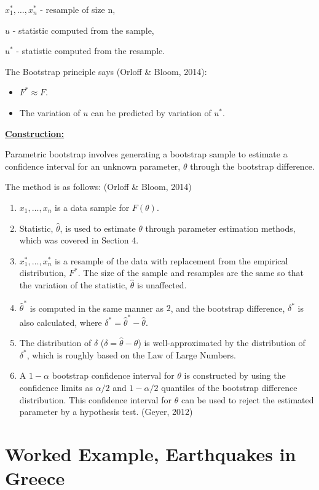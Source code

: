 \documentclass{article}
\begin{document}
$x^{*}_1,\ldots, x^{*}_n$ - resample of size n,

$u$ - statistic computed from the sample,

$u^{*}$ - statistic computed from the resample.

The Bootstrap principle says (Orloff \& Bloom, 2014):
\begin{itemize}
  \item $F^{*} \approx F$.
  \item The variation of $u$ can be predicted by variation of $u^{*}$.
\end{itemize}

\underline{\textbf{Construction:}}

Parametric bootstrap involves generating a bootstrap sample to estimate a confidence interval for an unknown parameter, $\theta$ through the bootstrap difference.

The method is as follows: (Orloff \& Bloom, 2014)
\begin{enumerate}
  \item $x_1,\ldots,x_n$ is a data sample for $F(\theta)$.
  \item Statistic, $\hat{\theta}$, is used to estimate $\theta$ through parameter estimation methods, which was covered in Section 4.
  \item $x^{*}_1,\ldots,x^{*}_n$ is a resample of the data with replacement from the empirical distribution, $F^{*}$. The size of the sample and resamples are the same so that the variation of the statistic, $\hat{\theta}$ is unaffected.
  \item $\hat{\theta}^{*}$ is computed in the same manner as $2$, and the bootstrap difference, $\delta^{*}$ is also calculated, where $\delta^{*} = \hat{\theta}^{*} - \hat{\theta}$.
  \item The distribution of $\delta$ ($\delta = \hat{\theta} - \theta$) is well-approximated by the distribution of $\delta^{*}$, which is roughly based on the Law of Large Numbers.
  \item A $1-\alpha$ bootstrap confidence interval for $\theta$ is constructed by using the confidence limits as $\alpha/2$ and $1 -\alpha/2$ quantiles of the bootstrap difference distribution. This confidence interval for $\theta$ can be used to reject the estimated parameter by a hypothesis test. (Geyer, 2012)
\end{enumerate}




\newpage
\section{Worked Example, Earthquakes in Greece}
\end{document}
